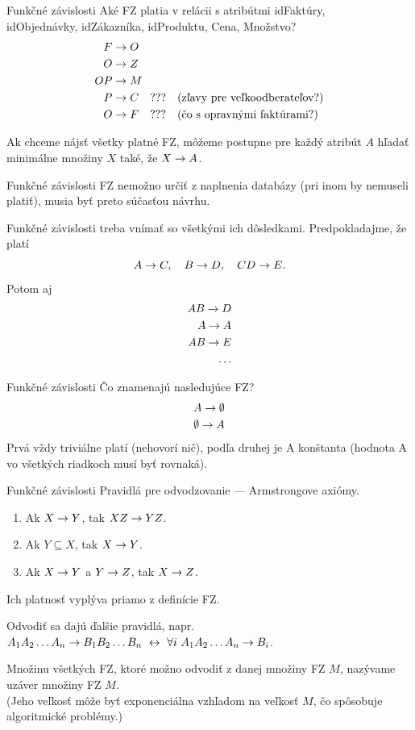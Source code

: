 \documentclass[12pt]{beamer}
\begin{document}
\begin{frame}[fragile]{Funkčné závislosti}
Aké FZ platia v relácii s atribútmi idFaktúry,\\
idObjednávky, idZákazníka, idProduktu, Cena, Množstvo?\\
\pause
\begin{align*}
F &\rightarrow O\\
O &\rightarrow Z\\
OP &\rightarrow M\\
P &\rightarrow C\quad ??? \quad (\text{zľavy pre veľkoodberateľov?})\\
O &\rightarrow F\quad ??? \quad (\text{čo s opravnými faktúrami?})
\end{align*}

\bigskip
Ak chceme nájsť všetky platné FZ, môžeme postupne pre každý atribút $A$ hľadať minimálne množiny $X$ také, že $X\rightarrow A$.
\end{frame}

\begin{frame}[fragile]{Funkčné závislosti}
FZ nemožno určiť z naplnenia databázy (pri inom by nemuseli platiť), musia byť preto súčasťou návrhu.
\bigskip

Funkčné závislosti treba vnímať so všetkými ich dôsledkami. Predpokladajme, že platí
$$
A\rightarrow C,\quad B\rightarrow D,\quad CD\rightarrow E.
$$
Potom aj
\begin{eqnarray*}
AB\rightarrow D\\
A\rightarrow A\\
AB\rightarrow E\\
\dots
\end{eqnarray*}
\end{frame}

\begin{frame}[fragile]{Funkčné závislosti}
Čo znamenajú nasledujúce FZ?
\begin{eqnarray*}
A\rightarrow \emptyset\\
\emptyset\rightarrow A
\end{eqnarray*}
\pause
Prvá vždy triviálne platí (nehovorí nič), podľa druhej je A konštanta (hodnota A vo všetkých riadkoch musí byť rovnaká).
\end{frame}

\begin{frame}[fragile]{Funkčné závislosti}
Pravidlá pre odvodzovanie --- Armstrongove axiómy.
\begin{enumerate}
\item Ak $X\rightarrow Y$, tak $XZ\rightarrow YZ$.
\item Ak $Y \subseteq X$, tak $X\rightarrow Y$.
\item Ak $X\rightarrow Y$ a $Y\rightarrow Z$, tak $X\rightarrow Z$.
\end{enumerate}
Ich platnosť vyplýva priamo z definície FZ.
\bigskip

Odvodiť sa dajú ďalšie pravidlá, napr.
$A_1A_2\dots A_n\fz B_1B_2\dots B_n\ \leftrightarrow\ \forall i\ A_1A_2\dots A_n\fz B_i$.
\bigskip

Množinu všetkých FZ, ktoré možno odvodiť z danej množiny FZ $M$, nazývame \alert{uzáver množiny FZ} $M$.\\
(Jeho veľkosť môže byť exponenciálna vzhľadom na veľkosť $M$, čo spôsobuje algoritmické problémy.)
\end{frame}
\end{document}
